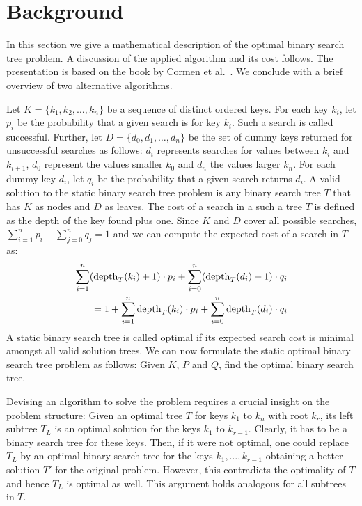 \section{Background}

In this section we give a mathematical description of the optimal binary
search tree problem. A discussion of the applied algorithm and its cost
follows. The presentation is based on the book by Cormen et
al.~\cite{MITBook}. We conclude with a brief overview of two alternative
algorithms.

 Let $K = \{k_1, k_2, \dots, k_n\}$ be a sequence
of distinct ordered keys. For each key $k_i$, let $p_i$ be the probability
that a given search is for key $k_i$. Such a search is called successful.
Further, let $D = \{d_0, d_1, \dots, d_n\}$ be the set of dummy keys
returned for unsuccessful searches as follows: $d_i$ represents searches
for values between $k_i$ and $k_{i+1}$, $d_0$ represent the values smaller
$k_0$ and $d_n$ the values larger $k_n$. For each dummy key $d_i$, let
$q_i$ be the probability that a given search returns $d_i$.
A valid solution to the static binary search tree problem is any binary
search tree $T$ that has $K$ as nodes and $D$ as leaves.
The cost of a search in a such a tree $T$ is defined as the depth of the key
found plus one. Since $K$ and $D$ cover all possible searches,
$\sum_{i=1}^n p_i + \sum_{j=0}^n q_j = 1$ and we can compute the expected
cost of a search in $T$ as:
\begin{align}
  \sum_{i=1}^n (\operatorname{depth}_T(k_i) + 1) \cdot p_i
   + \sum_{i=0}^n (\operatorname{depth}_T(d_i) + 1) \cdot q_i
  \nonumber\\
  = 1 + \sum_{i=1}^n \operatorname{depth}_T(k_i) \cdot p_i
      + \sum_{i=0}^n \operatorname{depth}_T(d_i) \cdot q_i
  \label{eqn:cost}
\end{align}
A static binary search tree is called optimal if its expected search cost
is minimal amongst all valid solution trees.
We can now formulate the static optimal binary search tree problem as
follows: Given $K$, $P$ and $Q$, find the optimal binary search tree.

 Devising an algorithm to solve the problem requires a
crucial insight on the problem structure: Given an optimal tree $T$ for
keys $k_1$ to $k_n$ with root $k_r$, its left subtree $T_L$ is an optimal
solution for the keys $k_1$ to $k_{r-1}$. Clearly, it has to be a binary
search tree for these keys. Then, if it were not optimal, one could replace
$T_L$ by an optimal binary search tree for the keys $k_1,\dots,k_{r-1}$
obtaining a better solution $T'$ for the original problem. However, this
contradicts the optimality of $T$ and hence $T_L$ is optimal as well. This
argument holds analogous for all subtrees in $T$.

